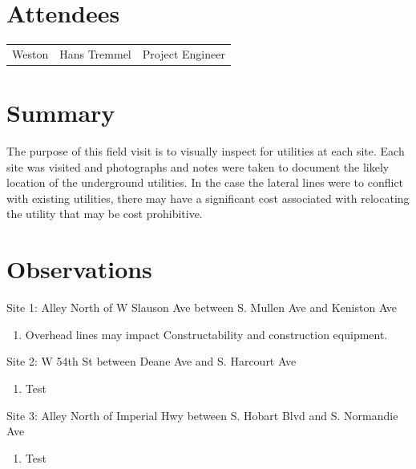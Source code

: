\documentclass{article}
\newenvironment{pres}[2]{%
  \large{#2}
}
{
  \goodbreak
  \smallskip
}
\begin{document}
\section*{Attendees}
\begin{table}[h]
  \label{tab:label}
  \begin{tabular}{l l l}
    Weston & Hans Tremmel & Project Engineer \\
  \end{tabular}
\end{table}

\section*{Summary}
The purpose of this field visit is to visually inspect for utilities at each site.  Each site was visited and photographs and notes were taken to document the likely location of the underground utilities.  In the case the lateral lines were to conflict with existing utilities, there may have a significant cost associated with relocating the utility that may be cost prohibitive.

\section*{Observations}
\begin{pres}{}{Site 1: Alley North of W Slauson Ave between S. Mullen Ave and Keniston Ave}
  \begin{enumerate}[noitemsep]
      \item Overhead lines may impact Constructability and construction equipment.
  \end{enumerate}

\end{pres}

\begin{pres}{}{Site 2: W 54th St between Deane Ave and S. Harcourt Ave}
  \begin{enumerate}[noitemsep]
      \item Test
  \end{enumerate}

\end{pres}

\begin{pres}{}{Site 3: Alley North of Imperial Hwy between S. Hobart Blvd and S. Normandie Ave}
  \begin{enumerate}[noitemsep]
      \item Test
  \end{enumerate}
\end{pres}
\end{document}
